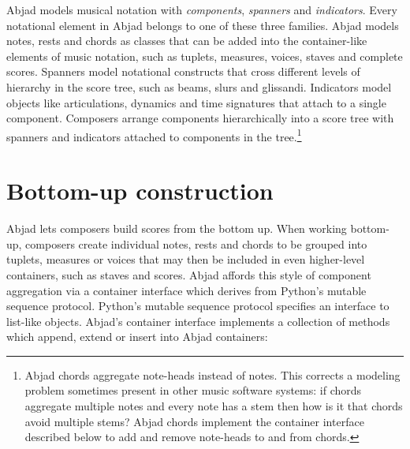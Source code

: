 \documentclass{article}
\begin{document}
Abjad models musical notation with \emph{components}, \emph{spanners} and
\emph{indicators}. Every notational element in Abjad belongs to one of these
three families. Abjad models notes, rests and chords as classes that can be
added into the container-like elements of music notation, such as tuplets,
measures, voices, staves and complete scores.
Spanners model notational
constructs that cross different levels of hierarchy in the score tree, such as
beams, slurs and glissandi. Indicators model objects like articulations, dynamics and time signatures that attach to a single
component.
Composers arrange components hierarchically
into a score tree with spanners and indicators attached to components in the
tree.\footnote{Abjad chords
aggregate note-heads instead of notes. This corrects a modeling problem sometimes present in other music software systems: if chords aggregate multiple notes and every note has a stem then how is it that chords avoid multiple stems? Abjad chords implement the container interface described below to add and remove note-heads to and from chords.}

\section{Bottom-up construction} \label{sec:bottom-up}

Abjad lets composers build scores from the bottom up. When working bottom-up,
composers create individual notes, rests and chords
to be grouped into tuplets, measures or
voices that may then be included in even higher-level containers, such as
staves and scores.
Abjad affords this
style of component aggregation via a container interface which derives from Python's mutable sequence protocol. Python's mutable sequence protocol specifies an interface to list-like objects. Abjad's container interface implements a collection of methods which append, extend
or insert into Abjad containers:
\end{document}
